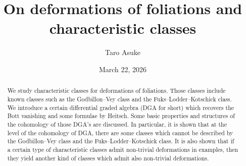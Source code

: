 \documentclass[12pt]{amsart}
\title{On deformations of foliations and characteristic classes}
\author{Taro Asuke}
\date{March 22, 2026}
\theoremstyle{definition}
\theoremstyle{remark}
\begin{document}
%
\begin{abstract}
We study characteristic classes for deformations of foliations.
Those classes include known classes such as the Godbillon--Vey class and the Fuks--Lodder--Kotschick class.
We introduce a certain differential graded algebra (DGA for short) which recovers the Bott vanishing and some formulae by Heitsch.
Some basic properties and structures of the cohomology of those DGA's are discussed.
In particular, it is shown that at the level of the cohomology of DGA, there are some classes which cannot be described by the Godbillon--Vey class and the Fuks--Lodder--Kotschick class.
It is also shown that if a certain type of characteristic classes admit non-trivial deformations in examples, then they yield another kind of classes which admit also non-trivial deformations.
\end{abstract}
%
\maketitle
\setlength{\baselineskip}{16pt}

\end{document}

